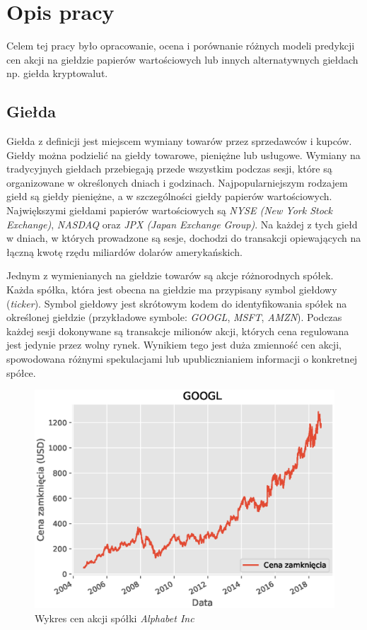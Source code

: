 \documentclass[a4paper, twoside, 11pt, openright]{article}
\begin{document}
\section{Opis pracy}

Celem tej pracy było opracowanie, ocena i porównanie różnych modeli predykcji cen akcji na giełdzie papierów wartościowych lub innych alternatywnych giełdach np. giełda kryptowalut.

\subsection{Giełda}

Giełda z definicji jest miejscem wymiany towarów przez sprzedawców i kupców. Giełdy można podzielić na giełdy towarowe, pieniężne lub usługowe. Wymiany na tradycyjnych giełdach przebiegają przede wszystkim podczas sesji, które są organizowane w określonych dniach i godzinach. Najpopularniejszym rodzajem giełd są giełdy pieniężne, a w szczególności giełdy papierów wartościowych. Największymi giełdami papierów wartościowych są \textit{NYSE (New York Stock Exchange)}, \textit{NASDAQ} oraz \textit{JPX (Japan Exchange Group)}. Na każdej z tych giełd w dniach, w których prowadzone są sesje, dochodzi do transakcji opiewających na łączną kwotę rzędu miliardów dolarów amerykańskich.

\bigskip

 Jednym z wymienianych na giełdzie towarów są akcje różnorodnych spółek. Każda spółka, która jest obecna na giełdzie ma przypisany symbol giełdowy (\textit{ticker}). Symbol giełdowy jest skrótowym kodem do identyfikowania spółek na określonej giełdzie (przykładowe symbole: \textit{GOOGL}, \textit{MSFT}, \textit{AMZN}). Podczas każdej sesji dokonywane są transakcje milionów akcji, których cena regulowana jest jedynie przez wolny rynek. Wynikiem tego jest duża zmienność cen akcji, spowodowana różnymi spekulacjami lub upublicznianiem informacji o konkretnej spółce.

\begin{figure}[H]
\centering \includegraphics[scale=0.9]{img/linear_regression/l_r_stock_data}
\caption{Wykres cen akcji spółki \textit{Alphabet Inc}}
\label{alphabet_history}
\end{figure}
\end{document}
